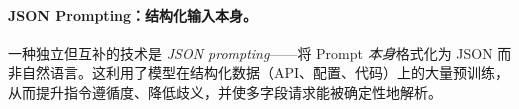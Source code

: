 \paragraph{JSON Prompting：结构化输入本身。}
\label{json-prompting-structuring-the-input.}

一种独立但互补的技术是 \emph{JSON prompting}——将 Prompt \emph{本身}格式化为 JSON 而非自然语言。这利用了模型在结构化数据（API、配置、代码）上的大量预训练，从而提升指令遵循度、降低歧义，并使多字段请求能被确定性地解析。

